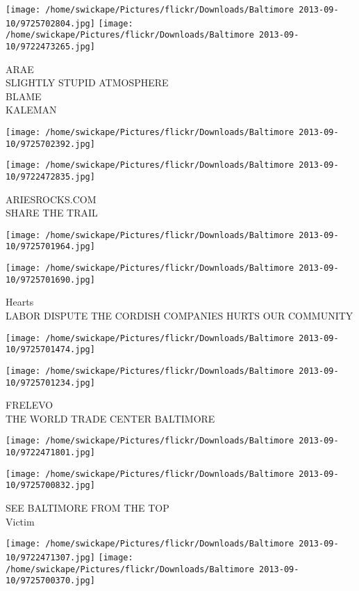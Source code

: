 \documentclass[10pt,letterpaper]{article}
\begin{document}
\texttt{[image: /home/swickape/Pictures/flickr/Downloads/Baltimore 2013-09-10/9725702804.jpg]}
\texttt{[image: /home/swickape/Pictures/flickr/Downloads/Baltimore 2013-09-10/9722473265.jpg]}

ARAE\\
SLIGHTLY STUPID ATMOSPHERE\\
BLAME\\
KALEMAN
\pagebreak

\texttt{[image: /home/swickape/Pictures/flickr/Downloads/Baltimore 2013-09-10/9725702392.jpg]}

\vspace{0.25in}
\texttt{[image: /home/swickape/Pictures/flickr/Downloads/Baltimore 2013-09-10/9722472835.jpg]}

ARIESROCKS.COM\\
SHARE THE TRAIL
\pagebreak

\texttt{[image: /home/swickape/Pictures/flickr/Downloads/Baltimore 2013-09-10/9725701964.jpg]}

\vspace{0.25in}
\texttt{[image: /home/swickape/Pictures/flickr/Downloads/Baltimore 2013-09-10/9725701690.jpg]}

Hearts\\
LABOR DISPUTE THE CORDISH COMPANIES HURTS OUR COMMUNITY
\pagebreak

\texttt{[image: /home/swickape/Pictures/flickr/Downloads/Baltimore 2013-09-10/9725701474.jpg]}

\vspace{0.25in}
\texttt{[image: /home/swickape/Pictures/flickr/Downloads/Baltimore 2013-09-10/9725701234.jpg]}

FRELEVO\\
THE WORLD TRADE CENTER BALTIMORE
\pagebreak

\texttt{[image: /home/swickape/Pictures/flickr/Downloads/Baltimore 2013-09-10/9722471801.jpg]}

\vspace{0.25in}
\texttt{[image: /home/swickape/Pictures/flickr/Downloads/Baltimore 2013-09-10/9725700832.jpg]}

SEE BALTIMORE FROM THE TOP\\
Victim
\pagebreak

\texttt{[image: /home/swickape/Pictures/flickr/Downloads/Baltimore 2013-09-10/9722471307.jpg]}
\texttt{[image: /home/swickape/Pictures/flickr/Downloads/Baltimore 2013-09-10/9725700370.jpg]}
\end{document}
